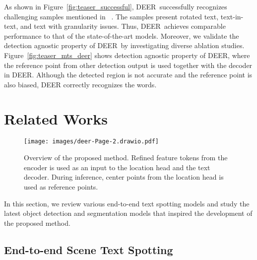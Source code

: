 \documentclass[10pt,twocolumn,letterpaper]{article}
\newcommand{\Figure}[1]{Figure~\ref{fig:#1}}
\newcommand{\methodname}[0]{DEER}
\begin{document}
As shown in \Figure{teaser_successful}, \methodname~successfully recognizes challenging samples mentioned in ~\cite{baek2020character,liao2020mask}. The samples present rotated text, text-in-text, and text with granularity issues. Thus, \methodname~achieves comparable performance to that of the state-of-the-art models. Moreover, we validate the detection agnostic property of \methodname~by investigating diverse ablation studies. \Figure{teaser_mts_deer} shows detection agnostic property of \methodname, where the reference point from other detection output is used together with the decoder in \methodname. Although the detected region is not accurate and the reference point is also biased, DEER correctly recognizes the words.  













 
\section{Related Works}
\begin{figure*}[t]
\begin{center}
\texttt{[image: images/deer-Page-2.drawio.pdf]}
\end{center}
   \caption{Overview of the proposed method. Refined feature tokens from the encoder is used as an input to the location head and the text decoder. During inference, center points from the location head is used as reference points.}
\label{fig:method}
\end{figure*}


In this section, we review various end-to-end text spotting models and study the latest object detection and segmentation models that inspired the development of the proposed method.





\subsection{End-to-end Scene Text Spotting}
\label{ss:e2e_sts}
\end{document}
